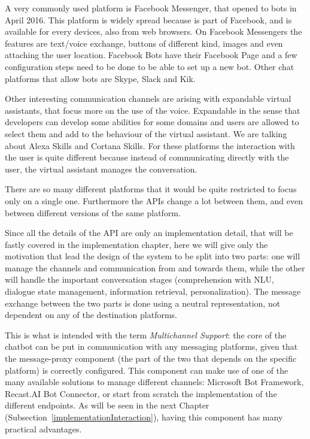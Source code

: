 A very commonly used platform is Facebook Messenger, that opened to bots in April 2016. This platform is widely spread because is part of Facebook, and is available for every devices, also from web browsers. On Facebook Messengers the features are text/voice exchange, buttons of different kind, images and even attaching the user location. Facebook Bots have their Facebook Page and a few configuration steps need to be done to be able to set up a new bot. Other chat platforms that allow bots are Skype, Slack and Kik.

Other interesting communication channels are arising with expandable virtual assistants, that focus more on the use of the voice. Expandable in the sense that developers can develop some abilities for some domains and users are allowed to select them and add to the behaviour of the virtual assistant. We are talking about Alexa Skills and Cortana Skills. For these platforms the interaction with the user is quite different because instead of communicating directly with the user, the virtual assistant manages the conversation.

There are so many different platforms that it would be quite restricted to focus only on a single one. Furthermore the APIs change a lot between them, and even between different versions of the same platform.

Since all the details of the API are only an implementation detail, that will be fastly covered in the implementation chapter, here we will give only the motivation that lead the design of the system to be split into two parts: one will manage the channels and communication from and towards them, while the other will handle the important conversation stages (comprehension with NLU, dialogue state management, information retrieval, personalization). The message exchange between the two parts is done using a neutral representation, not dependent on any of the destination platforms.

This is what is intended with the term \textit{Multichannel Support}: the core of the chatbot can be put in communication with any messaging platforms, given that the message-proxy component (the part of the two that depends on the specific platform) is correctly configured. This component can make use of one of the many available solutions to manage different channels: Microsoft Bot Framework, Recast.AI Bot Connector, or start from scratch the implementation of the different endpoints. As will be seen in the next Chapter (Subsection~\ref{implementationInteraction}), having this component has many practical advantages.

